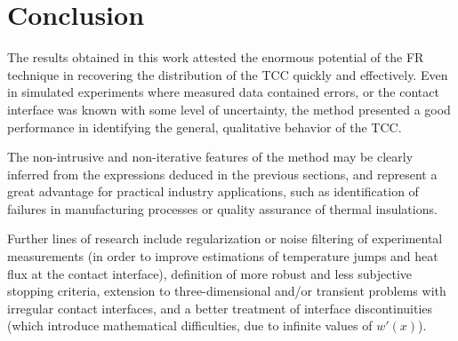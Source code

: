 \documentclass[12pt]{CHT-20}
\begin{document}

\section*{Conclusion}

The results obtained in this work attested the enormous potential of the FR technique in recovering the distribution of the TCC quickly and effectively. Even in simulated experiments where measured data contained errors, or the contact interface was known with some level of uncertainty, the method presented a good performance in identifying the general, qualitative behavior of the TCC.

The non-intrusive and non-iterative features of the method may be clearly inferred from the expressions deduced in the previous sections, and represent a great advantage for practical industry applications, such as identification of failures in manufacturing processes or quality assurance of thermal insulations.

Further lines of research include regularization or noise filtering of experimental measurements (in order to improve estimations of temperature jumps and heat flux at the contact interface), definition of more robust and less subjective stopping criteria, extension to three-dimensional and/or transient problems with irregular contact interfaces, and a better treatment of interface discontinuities (which introduce mathematical difficulties, due to infinite values of $w'(x)$).
\end{document}

